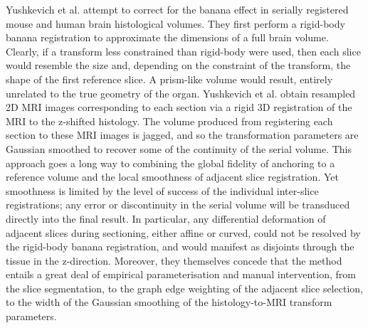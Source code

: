   Yushkevich et al. attempt to correct for the banana effect in serially registered mouse \cite{Yushkevich2006} and human \cite{Adler2012} brain histological volumes. They first perform a rigid-body banana registration to approximate the dimensions of a full brain volume. Clearly, if a transform less constrained than rigid-body were used, then each slice would resemble the size and, depending on the constraint of the transform, the shape of the first reference slice. A prism-like volume would result, entirely unrelated to the true geometry of the organ. Yushkevich et al. obtain resampled 2D MRI images corresponding to each section via a rigid 3D registration of the MRI to the z-shifted histology. The volume produced from registering each section to these MRI images is jagged, and so the transformation parameters are Gaussian smoothed to recover some of the continuity of the serial volume. This approach goes a long way to combining the global fidelity of anchoring to a reference volume and the local smoothness of adjacent slice registration. Yet smoothness is limited by the level of success of the individual inter-slice registrations; any error or discontinuity in the serial volume will be transduced directly into the final result. In particular, any differential deformation of adjacent slices during sectioning, either affine or curved, could not be resolved by the rigid-body banana registration, and would manifest as disjoints through the tissue in the z-direction. Moreover, they themselves concede that the method entails a great deal of empirical parameterisation and manual intervention, from the slice segmentation, to the graph edge weighting of the adjacent slice selection, to the width of the Gaussian smoothing of the histology-to-MRI transform parameters.
  
